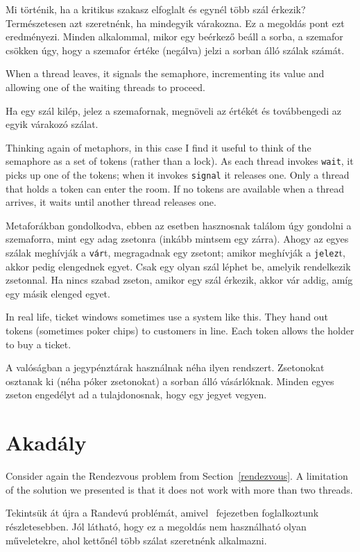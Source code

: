 \documentclass{book}
\begin{document}
Mi történik, ha a kritikus szakasz elfoglalt és egynél több szál érkezik?
Természetesen azt szeretnénk, ha mindegyik várakozna. Ez a megoldás pont
ezt eredményezi. Minden alkalommal, mikor egy beérkező beáll a sorba,
a szemafor csökken úgy, hogy a szemafor értéke (negálva) jelzi a sorban
álló szálak számát.

When a thread leaves, it signals the semaphore, incrementing
its value and allowing one of the waiting threads to proceed.

Ha egy szál kilép, jelez a szemafornak, megnöveli az értékét és továbbengedi
az egyik várakozó szálat.

Thinking again of metaphors, in this case I find it useful
to think of the semaphore as a set of tokens (rather than
a lock).
As each thread invokes {\tt wait}, it picks up one of
the tokens; when it invokes {\tt signal} it releases one.
Only a thread that holds a token can enter the room.  If no
tokens are available when a thread arrives, it waits until
another thread releases one.

Metaforákban gondolkodva, ebben az esetben hasznosnak találom úgy gondolni
a szemaforra, mint egy adag zsetonra (inkább mintsem egy zárra). Ahogy az
egyes szálak meghívják a {\tt vár}t, megragadnak egy zsetont; amikor meghívják a {\tt jelez}t,
akkor pedig elengednek egyet. Csak egy olyan szál léphet be, amelyik rendelkezik zsetonnal.
Ha  nincs szabad zseton, amikor egy szál érkezik, akkor vár addig,
amíg egy másik elenged egyet.

In real life, ticket windows sometimes use a system like
this.  They hand out tokens (sometimes poker chips) to
customers in line.  Each token allows the holder to buy a ticket.


A valóságban a jegypénztárak használnak néha ilyen rendszert. Zsetonokat osztanak ki
(néha póker zsetonokat) a sorban álló vásárlóknak. Minden egyes zseton engedélyt ad
a tulajdonosnak, hogy egy jegyet vegyen. 



\section{Akadály}

Consider again the Rendezvous problem from Section~\ref{rendezvous}.
A limitation of the solution we presented is that it does
not work with more than two threads.


Tekintsük át újra a Randevú problémát, amivel ~fejezetben foglalkoztunk
részletesebben. Jól látható, hogy ez a megoldás nem használható olyan műveletekre,
ahol kettőnél több szálat szeretnénk alkalmazni.
\end{document}
